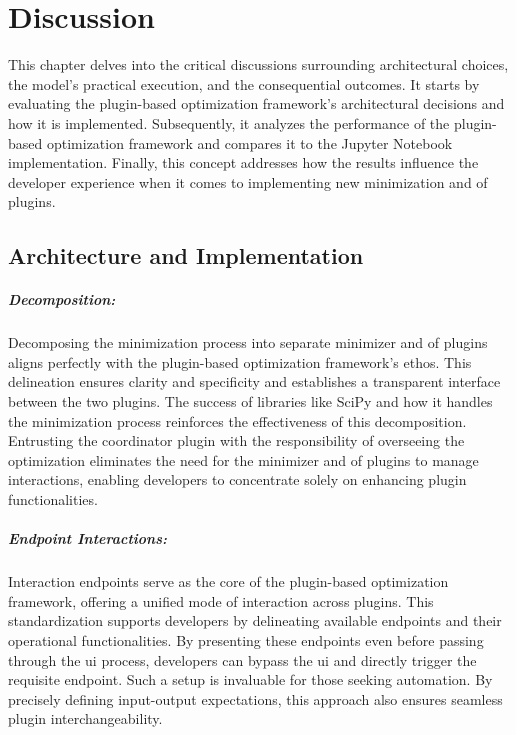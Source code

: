\documentclass[
  a4paper,  %
  twoside,  %
  bibliography=totoc,
  headsepline,
  cleardoublepage=empty,
  parskip=half,
  draft=false
]{scrbook}
\begin{document}
\chapter{Discussion}
\label{chap:discussion}

This chapter delves into the critical discussions surrounding architectural choices, the model's practical execution, and the consequential outcomes.
It starts by evaluating the plugin-based optimization framework's architectural decisions and how it is implemented.
Subsequently, it analyzes the performance of the plugin-based optimization framework and compares it to the Jupyter Notebook implementation.
Finally, this concept addresses how the results influence the developer experience when it comes to implementing new minimization and \gls{of} plugins.

\section{Architecture and Implementation}
\paragraph{Decomposition:}
\label{sec:decomposition}

Decomposing the minimization process into separate minimizer and \gls{of} plugins aligns perfectly with the plugin-based optimization framework's ethos.
This delineation ensures clarity and specificity and establishes a transparent interface between the two plugins.
The success of libraries like SciPy and how it handles the minimization process \cite{Virtanen2020} reinforces the effectiveness of this decomposition.
Entrusting the coordinator plugin with the responsibility of overseeing the optimization eliminates the need for the minimizer and \gls{of} plugins to manage interactions, enabling developers to concentrate solely on enhancing plugin functionalities.

\paragraph{Endpoint Interactions:}
\label{sec:enpointinteractions}

Interaction endpoints serve as the core of the plugin-based optimization framework, offering a unified mode of interaction across plugins.
This standardization supports developers by delineating available endpoints and their operational functionalities.
By presenting these endpoints even before passing through the \gls{ui} process, developers can bypass the \gls{ui} and directly trigger the requisite endpoint.
Such a setup is invaluable for those seeking automation.
By precisely defining input-output expectations, this approach also ensures seamless plugin interchangeability.
\end{document}
